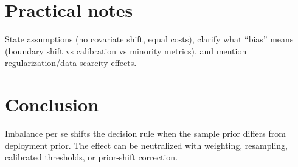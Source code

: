 \documentclass[11pt]{article}
\begin{document}
\section{Practical notes}
State assumptions (no covariate shift, equal costs), clarify what ``bias'' means (boundary shift vs calibration vs minority metrics), and mention regularization/data scarcity effects.

\section{Conclusion}
Imbalance per se shifts the decision rule when the sample prior differs from deployment prior.
The effect can be neutralized with weighting, resampling, calibrated thresholds, or prior-shift correction.
\end{document}
